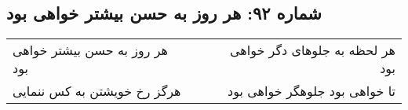 \begin{center}
\section*{شماره ۹۲: هر روز به حسن بیشتر خواهی بود}
\label{sec:092}
\begin{longtable}{l p{0.5cm} r}
هر روز به حسن بیشتر خواهی بود
&&
هر لحظه به جلوهای دگر خواهی بود
\\
هرگز رخ خویشتن به کس ننمایی
&&
تا خواهی بود جلوهگر خواهی بود
\\
\end{longtable}
\end{center}
